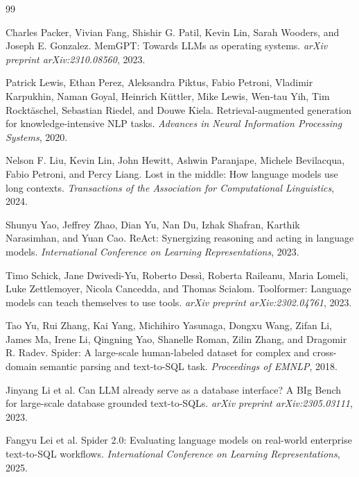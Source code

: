 \documentclass[10pt]{article}
\begin{document}
\begin{thebibliography}{99}

Charles Packer, Vivian Fang, Shishir G. Patil, Kevin Lin, Sarah Wooders, and Joseph E. Gonzalez.
\newblock MemGPT: Towards LLMs as operating systems.
\newblock \emph{arXiv preprint arXiv:2310.08560}, 2023.

Patrick Lewis, Ethan Perez, Aleksandra Piktus, Fabio Petroni, Vladimir Karpukhin, Naman Goyal, Heinrich K\"uttler, Mike Lewis, Wen-tau Yih, Tim Rockt\"aschel, Sebastian Riedel, and Douwe Kiela.
\newblock Retrieval-augmented generation for knowledge-intensive NLP tasks.
\newblock \emph{Advances in Neural Information Processing Systems}, 2020.

Nelson F. Liu, Kevin Lin, John Hewitt, Ashwin Paranjape, Michele Bevilacqua, Fabio Petroni, and Percy Liang.
\newblock Lost in the middle: How language models use long contexts.
\newblock \emph{Transactions of the Association for Computational Linguistics}, 2024.

Shunyu Yao, Jeffrey Zhao, Dian Yu, Nan Du, Izhak Shafran, Karthik Narasimhan, and Yuan Cao.
\newblock ReAct: Synergizing reasoning and acting in language models.
\newblock \emph{International Conference on Learning Representations}, 2023.

Timo Schick, Jane Dwivedi-Yu, Roberto Dess\`i, Roberta Raileanu, Maria Lomeli, Luke Zettlemoyer, Nicola Cancedda, and Thomas Scialom.
\newblock Toolformer: Language models can teach themselves to use tools.
\newblock \emph{arXiv preprint arXiv:2302.04761}, 2023.

Tao Yu, Rui Zhang, Kai Yang, Michihiro Yasunaga, Dongxu Wang, Zifan Li, James Ma, Irene Li, Qingning Yao, Shanelle Roman, Zilin Zhang, and Dragomir R. Radev.
\newblock Spider: A large-scale human-labeled dataset for complex and cross-domain semantic parsing and text-to-SQL task.
\newblock \emph{Proceedings of EMNLP}, 2018.

Jinyang Li et al.
\newblock Can LLM already serve as a database interface? A BIg Bench for large-scale database grounded text-to-SQLs.
\newblock \emph{arXiv preprint arXiv:2305.03111}, 2023.

Fangyu Lei et al.
\newblock Spider 2.0: Evaluating language models on real-world enterprise text-to-SQL workflows.
\newblock \emph{International Conference on Learning Representations}, 2025.


\end{thebibliography}
\end{document}
